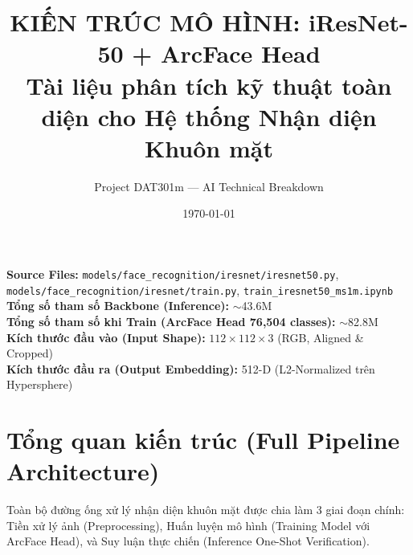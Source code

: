 \documentclass[11pt,a4paper]{article}
\title{\textbf{\Large KIẾN TRÚC MÔ HÌNH: iResNet-50 + ArcFace Head\\ \large Tài liệu phân tích kỹ thuật toàn diện cho Hệ thống Nhận diện Khuôn mặt}}
\author{Project DAT301m — AI Technical Breakdown}
\date{\today}
\begin{document}
\maketitle

\begin{tcolorbox}[colback=lightgray,colframe=primaryblue,title=\textbf{Thông tin Tổng quan (Metadata Summary)}]
\textbf{Source Files:} \texttt{models/face\_recognition/iresnet/iresnet50.py}, \texttt{models/face\_recognition/iresnet/train.py}, \texttt{train\_iresnet50\_ms1m.ipynb}\\
\textbf{Tổng số tham số Backbone (Inference):} $\sim$43.6M\\
\textbf{Tổng số tham số khi Train (ArcFace Head 76,504 classes):} $\sim$82.8M\\
\textbf{Kích thước đầu vào (Input Shape):} $112 \times 112 \times 3$ (RGB, Aligned \& Cropped)\\
\textbf{Kích thước đầu ra (Output Embedding):} 512-D (L2-Normalized trên Hypersphere)
\end{tcolorbox}

\tableofcontents
\newpage

\section{Tổng quan kiến trúc (Full Pipeline Architecture)}

Toàn bộ đường ống xử lý nhận diện khuôn mặt được chia làm 3 giai đoạn chính: Tiền xử lý ảnh (Preprocessing), Huấn luyện mô hình (Training Model với ArcFace Head), và Suy luận thực chiến (Inference One-Shot Verification).
\end{document}
